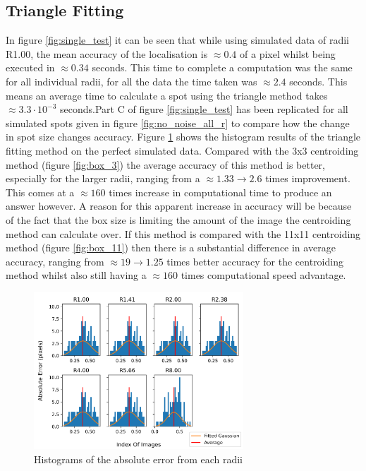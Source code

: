 \documentclass[aps,pra,a4paper,nofootinbib,onecolumn,tightenlines,longbibliography,12pt,amsfonts,amssymb,amsmath,floatfix]{revtex4-2} %
\begin{document}
  \subsection{Triangle Fitting} %
  \label{sub:Triangle Fitting}

  In figure \ref{fig:single_test} it can be seen that while using simulated data of radii R1.00, the mean accuracy of the 
  localisation is $\approx 0.4$ of a pixel whilst being executed in $\approx 0.34$ seconds. This time to complete a computation 
  was the same for all individual radii, for all the data the time taken was $\approx 2.4$ seconds. This means an 
  average time to calculate a spot using the triangle method takes $\approx 3.3\cdot 10^{-3}$ seconds.Part C of 
  figure \ref{fig:single_test} has been replicated for all simulated spots given in figure \ref{fig:no_noise_all_r}
  to compare how the change in spot size changes accuracy.
  Figure \ref{fig:distro} shows the histogram results of the triangle fitting method on the perfect simulated data. 
  Compared with the 3x3 centroiding method (figure \ref{fig:box_3}) the average accuracy of this method is better, especially for the 
  larger radii, ranging from a $\approx 1.33\rightarrow 2.6$ times improvement. This comes at a $\approx 160$ times 
  increase in computational time to produce an answer however. A reason for this apparent increase in accuracy will be 
  because of the fact that the box size is limiting the amount of the image the centroiding method can calculate over.
  If this method is compared with the 11x11 centroiding method (figure \ref{fig:box_11}) then there is a substantial 
  difference in average accuracy, ranging from $\approx 19 \rightarrow 1.25$ times better accuracy for the centroiding 
  method whilst also still having a $\approx 160$ times computational speed advantage.

  \begin{figure}[H]
    \begin{center}
      \includegraphics[width=0.7\textwidth]{project_pics/distro.png}
    \end{center}
    \caption{Histograms of the absolute error from each radii}
    \label{fig:distro}
  \end{figure}
\end{document}
